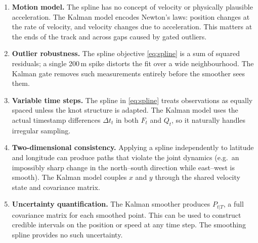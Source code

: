 \documentclass[11pt, a4paper]{article}
\theoremstyle{remark}
\begin{document}
\begin{enumerate}
  \item \textbf{Motion model.}
        The spline has no concept of velocity or physically plausible
        acceleration.  The Kalman model encodes Newton's laws: position
        changes at the rate of velocity, and velocity changes due to
        acceleration.  This matters at the ends of the track and across
        gaps caused by gated outliers.

  \item \textbf{Outlier robustness.}
        The spline objective \eqref{eq:spline} is a sum of squared
        residuals; a single 200\,m spike distorts the fit over a wide
        neighbourhood.  The Kalman gate removes such measurements entirely
        before the smoother sees them.

  \item \textbf{Variable time steps.}
        The spline in \eqref{eq:spline} treats observations as equally
        spaced unless the knot structure is adapted.  The Kalman model
        uses the actual timestamp differences $\Delta t_t$ in both $F_t$
        and $Q_t$, so it naturally handles irregular sampling.

  \item \textbf{Two-dimensional consistency.}
        Applying a spline independently to latitude and longitude can
        produce paths that violate the joint dynamics (e.g.\ an
        impossibly sharp change in the north--south direction while
        east--west is smooth).  The Kalman model couples $x$ and $y$
        through the shared velocity state and covariance matrix.

  \item \textbf{Uncertainty quantification.}
        The Kalman smoother produces $P_{t|T}$, a full covariance matrix
        for each smoothed point.  This can be used to construct credible
        intervals on the position or speed at any time step.
        The smoothing spline provides no such uncertainty.
\end{enumerate}
\end{document}
